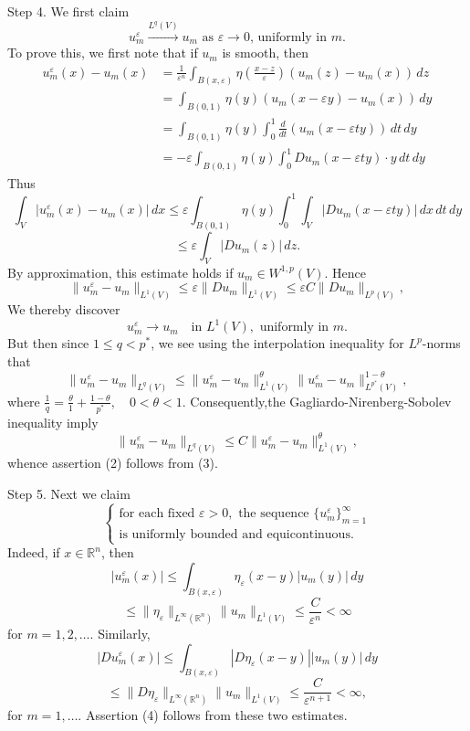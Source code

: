\begin{theorem}
    Step 4. We first claim
    \[
        u_m^\varepsilon \xrightarrow{L^q(V)} u_m  \text{ as } \varepsilon \to 0, \, \text{uniformly in } m.
    \]
    To prove this, we first note that if \( u_m \) is smooth, then
    \[
        \begin{aligned}
            u_m^\varepsilon(x) - u_m(x)
             & = \frac{1}{\varepsilon^n} \int_{B(x,\varepsilon)} \eta \left( \frac{x-z}{\varepsilon} \right) (u_m(z) - u_m(x)) \, dz \\
             & = \int_{B(0,1)} \eta(y)(u_m(x-\varepsilon y) - u_m(x)) \, dy                                                          \\
             & = \int_{B(0,1)} \eta(y) \int_0^1 \frac{d}{dt} (u_m(x-\varepsilon ty)) \, dt \, dy                                     \\
             & = -\varepsilon \int_{B(0,1)} \eta(y) \int_0^1 Du_m(x-\varepsilon ty) \cdot y \, dt \, dy
        \end{aligned}
    \]
    Thus
    \[
        \int_V |u_m^\varepsilon(x) - u_m(x)| \, dx \leq \varepsilon \int_{B(0,1)} \eta(y) \int_0^1 \int_V |Du_m(x-\varepsilon ty)| \, dx \, dt \, dy
    \]
    \[
        \leq \varepsilon \int_V |Du_m(z)| \, dz.
    \]
    By approximation, this estimate holds if \( u_m \in W^{1,p}(V) \). Hence
    \[
        \|u_m^\varepsilon - u_m\|_{L^1(V)} \leq \varepsilon \|Du_m\|_{L^1(V)} \leq \varepsilon C \|Du_m\|_{L^p(V)},
    \]
    We thereby discover
    \[
        u_m^\varepsilon \to u_m \quad \text{in } L^1(V), \text{ uniformly in } m.
    \]
    But then since \( 1 \leq q < p^* \), we see using the interpolation inequality for \( L^p \)-norms that
    \[
        \|u_m^\varepsilon - u_m\|_{L^q(V)} \leq \|u_m^\varepsilon - u_m\|_{L^1(V)}^\theta \|u_m^\varepsilon - u_m\|_{L^{p^*}(V)}^{1-\theta},
    \]
    where \(\frac{1}{q} = \frac{\theta}{1} + \frac{1-\theta}{p^*}, \quad 0 < \theta < 1\). Consequently,the Gagliardo-Nirenberg-Sobolev inequality imply
    \[
        \|u_m^\varepsilon - u_m\|_{L^q(V)} \leq C \|u_m^\varepsilon - u_m\|_{L^1(V)}^\theta,
    \]
    whence assertion (2) follows from (3).

    Step 5. Next we claim
    \[
        \begin{cases}
            \text{for each fixed } \varepsilon > 0, \text{ the sequence } \{u_m^\varepsilon\}_{m=1}^\infty \\
            \text{is uniformly bounded and equicontinuous.}
        \end{cases}
    \]
    Indeed, if \( x \in \mathbb{R}^n \), then
    \[
        |u_m^\varepsilon(x)| \leq \int_{B(x, \varepsilon)} \eta_\varepsilon(x-y)|u_m(y)| \, dy
    \]
    \[
        \leq \|\eta_\varepsilon\|_{L^\infty(\mathbb{R}^n)} \|u_m\|_{L^1(V)} \leq \frac{C}{\varepsilon^n} < \infty
    \]
    for \( m = 1, 2, \ldots \). Similarly,
    \[
        |Du_m^\varepsilon(x)| \leq \int_{B(x, \varepsilon)} |D\eta_\varepsilon(x-y)||u_m(y)| \, dy
    \]
    \[
        \leq \|D\eta_\varepsilon\|_{L^\infty(\mathbb{R}^n)} \|u_m\|_{L^1(V)} \leq \frac{C}{\varepsilon^{n+1}} < \infty,
    \]
    for \( m = 1, \ldots \). Assertion (4) follows from these two estimates.


\end{theorem}
